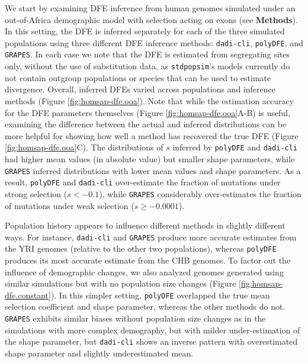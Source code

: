 \documentclass[hidelinks]{article}
\newcommand{\stdpopsim}{\texttt{stdpopsim}\xspace}
\newcommand{\polydfe}{\texttt{polyDFE}\xspace}
\newcommand{\dadicli}{\texttt{dadi-cli}\xspace}
\newcommand{\grapes}{\texttt{GRAPES}\xspace}
\begin{document}
    We start by examining DFE inference from human genomes simulated under an out-of-Africa demographic model
    with selection acting on exons (see \textbf{Methods}).
    In this setting, the DFE is inferred separately for each of the three simulated populations
    using three different DFE inference methods: \dadicli \citep{Huang2023}, \polydfe \citep{tataru2020polydfe}, 
    and \grapes \citep{galtier2016adaptive}.
    In each case we note that the DFE is estimated from segregating sites only,
    without the use of substitution data, as \stdpopsim's models currently do not
    contain outgroup populations or species that can be used to estimate divergence.
    Overall, inferred DFEs varied across populations and inference methods (Figure \ref{fig:homsap-dfe.ooa}).
    Note that while the estimation accuracy for the DFE parameters themselves (Figure \ref{fig:homsap-dfe.ooa}A-B) is useful,
    examining the difference between the actual and inferred distributions can be more helpful for showing how well a method
    has recovered the true DFE (Figure \ref{fig:homsap-dfe.ooa}C).
    The distributions of $s$ inferred by \polydfe and \dadicli had higher mean values (in absolute value)
    but smaller shape parameters, while \grapes inferred distributions with lower mean values and shape parameters.
    As a result, \polydfe and \dadicli over-estimate the fraction of mutations under strong selection ($s<-0.1$),
    while \grapes considerably over-estimates the fraction of mutations under weak selection ($s\geq-0.0001$).
    
    Population history appears to influence different methods in slightly different ways.
    For instance, \dadicli and \grapes produce more accurate estimates from the YRI genomes 
    (relative to the other two populations), whereas \polydfe
    produces its most accurate estimate from the CHB genomes.
    To factor out the influence of demographic changes, we also analyzed genomes generated using similar
    simulations but with no population size changes (Figure \ref{fig:homsap-dfe.constant}).
    In this simpler setting, \polydfe overlapped the true mean selection coefficient and shape parameter, whereas 
    the other methods do not. 
    \grapes exhibits similar biases without population size changes as in the simulations with more complex demography,
    but with milder under-estimation of the shape parameter, but \dadicli shows an inverse pattern
    with overestimated shape parameter and slightly underestimated mean. 
    
\end{document}
